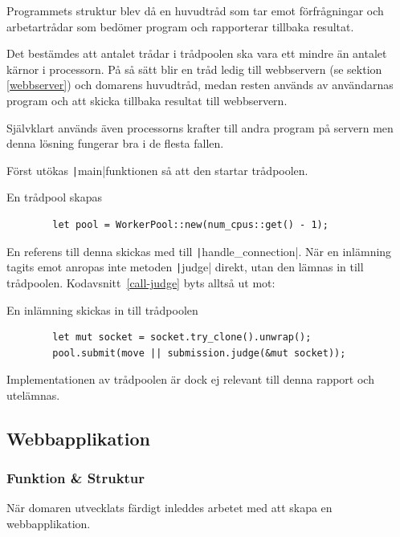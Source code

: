 \documentclass{article}
\renewcommand*\listingscaption{Kodavsnitt}
\newcommand*\coderef[1]{\listingscaption~\ref{#1}}
\begin{document}
Programmets struktur blev då en huvudtråd som tar emot förfrågningar och
arbetartrådar som bedömer program och rapporterar tillbaka resultat.

Det bestämdes att antalet trådar i trådpoolen ska vara ett mindre än antalet
kärnor i processorn. På så sätt blir en tråd ledig till webbservern (se
sektion \ref{webbserver}) och domarens huvudtråd, medan resten används av
användarnas program och att skicka tillbaka resultat till webbservern.

Självklart används även processorns krafter till andra program på servern men
denna lösning fungerar bra i de flesta fallen.

Först utökas \texttt|main|funktionen så att den startar
trådpoolen.

\begin{listing}[H]
	\caption{En trådpool skapas}
	\begin{verbatim}
		let pool = WorkerPool::new(num_cpus::get() - 1);
	\end{verbatim}
\end{listing}

En referens till denna skickas med till
\texttt|handle_connection|. När en
inlämning tagits emot anropas inte metoden \texttt|judge| direkt, utan den
lämnas in till trådpoolen. \coderef{call-judge} byts alltså ut mot:

\begin{listing}[H]
	\caption{En inlämning skickas in till trådpoolen}
	\begin{verbatim}
        let mut socket = socket.try_clone().unwrap();
        pool.submit(move || submission.judge(&mut socket));
	\end{verbatim}
\end{listing}

Implementationen av trådpoolen är dock ej relevant till denna rapport och
utelämnas.

\subsection{Webbapplikation}

\subsubsection{Funktion \& Struktur}

När domaren utvecklats färdigt inleddes arbetet med att skapa en
webbapplikation.
\end{document}
